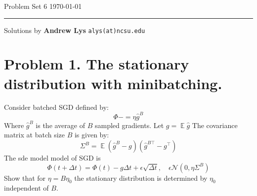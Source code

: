 \documentclass{amsart}
\newcommand{\cN}{\mathcal{N}}
\DeclareMathOperator{\ee}{\mathbb{E}}
\theoremstyle{definition}
\begin{document}
\noindent
Problem Set 6  \hfill \today  %
\smallskip
\hrule
\smallskip
\noindent
Solutions by {\bf Andrew Lys} \qquad   %
  {\tt alys(at)ncsu.edu}

\vspace{0.5cm}

\section*{Problem 1. The stationary distribution with minibatching.}
Consider batched SGD defined by:
\[
\Phi -= \eta \hat{g}^B
\]
Where $\hat{g}^B$ is the average of $B$ sampled gradients. 
Let $g = \ee{\hat{g}}$
The covariance matrix at batch size $B$ is given by:
\[
\Sigma^B = \ee{(\hat{g}^B - g)(\hat{g}^{B\top} - g^\top)}
\]
The sde model model of SGD is 
\[
\Phi(t + \Delta t) = \Phi(t) - g\Delta t + \epsilon \sqrt{\Delta t}, \quad \epsilon \cN(0, \eta \Sigma^B)
\]
Show that for $\eta = B \eta_0$ the stationary distribution is determined by $\eta_0$ independent of $B$. 
\end{document}
